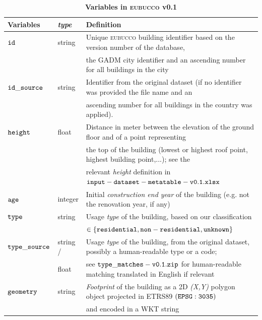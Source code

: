 \documentclass[fleqn,10pt]{wlscirep}
\begin{document}
\begin{table}[h!]
\centering
\renewcommand{\arraystretch}{1.4}
\begin{tabular}{lll}
\hline
\textbf{Variables} & \textbf{\textit{type}} & \textbf{Definition} \\
\hline
${\tt id}$ & string & Unique \textsc{eubucco} building identifier based on the version number of the database, 
\\ & & the GADM city identifier and an ascending number for all buildings in the city \\

${\tt id\_source}$ & string & Identifier from the original dataset (if no identifier was provided the file name and an 
\\ & & ascending number for all buildings in the country was applied). \\

${\tt height}$ & float & Distance in meter between the elevation of the ground floor and of a point representing \\
& & the top of the building (lowest or highest roof point, highest building point,...); see the \\
& & relevant \textit{height} definition in ${\tt input-dataset-metatable-v0.1.xlsx}$ \\

$\tt{age}$ & integer &  Initial \textit{construction end year} of the building (e.g. not the renovation year, if any) \\

$\tt{type}$ & string & Usage \textit{type} of the building, based on our classification \\
&& $ \in \{\tt{residential},\tt{non-residential},\tt{unknown}\} $ \\

${\tt type\_source}$ & string / & Usage \textit{type} of the building, from the original dataset, possibly a human-readable type or a code; \\
& float & see ${\tt type\_matches-v0.1.zip}$ for human-readable matching translated in English if relevant \\

${\tt geometry}$ & string & \textit{Footprint} of the building as a 2D \textit{(X,Y)} polygon object projected in ETRS89
$(\tt{EPSG:3035})$ \\
& & and encoded in a WKT string \\
\hline
\end{tabular}
\caption{\label{tab:variables}\textbf{Variables in \textsc{eubucco} v0.1}}
\end{table}
\end{document}
